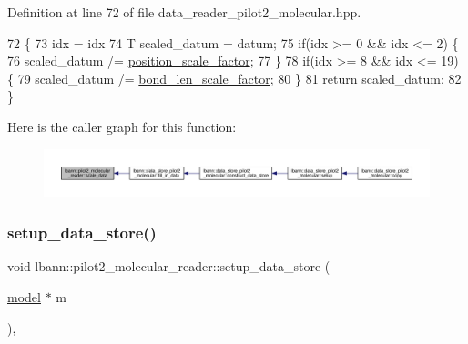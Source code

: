 Definition at line 72 of file data\+\_\+reader\+\_\+pilot2\+\_\+molecular.\+hpp.


\begin{DoxyCode}
72                                  \{
73     idx = idx %
74     T scaled\_datum = datum;
75     \textcolor{keywordflow}{if}(idx >= 0 && idx <= 2) \{ 
76       scaled\_datum /= \hyperlink{classlbann_1_1pilot2__molecular__reader_a0f85cc2fc807d8c7dc6fb4f93db5e09a}{position\_scale\_factor};
77     \}
78     \textcolor{keywordflow}{if}(idx >= 8 && idx <= 19) \{
79       scaled\_datum /= \hyperlink{classlbann_1_1pilot2__molecular__reader_aa300abb1c1b72776c129487e57a7b70f}{bond\_len\_scale\_factor};
80     \}
81     \textcolor{keywordflow}{return} scaled\_datum;
82   \}
\end{DoxyCode}
Here is the caller graph for this function\+:\nopagebreak
\begin{figure}[H]
\begin{center}
\leavevmode
\includegraphics[width=350pt]{classlbann_1_1pilot2__molecular__reader_add998998fa16444e4509b08f79b291da_icgraph}
\end{center}
\end{figure}
\mbox{\label{classlbann_1_1pilot2__molecular__reader_a0c18335afe5625a7aa8b8275392c0317}} 
\subsubsection{\texorpdfstring{setup\+\_\+data\+\_\+store()}{setup\_data\_store()}}
{\footnotesize\ttfamily void lbann\+::pilot2\+\_\+molecular\+\_\+reader\+::setup\+\_\+data\+\_\+store (\begin{DoxyParamCaption}\item[{\hyperlink{classlbann_1_1model}{model} $\ast$}]{m }\end{DoxyParamCaption})\hspace{0.3cm}{\ttfamily [override]}, {\ttfamily [virtual]}}



